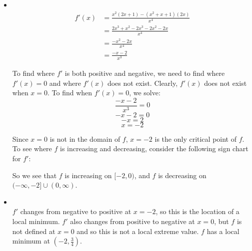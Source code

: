 \documentclass[handout,nooutcomes]{ximera}
\begin{document}
\begin{problem}
\begin{freeResponse}
\begin{itemize}
			
			
			\item  {}  \\
			
			\begin{align*}
			f'(x) &= \frac{x^2(2x+1) - (x^2+x+1)(2x)}{x^4} \\
			&= \frac{2x^3 + x^2 - 2x^3 - 2x^2 - 2x}{x^4} \\
			&= \frac{-x^2 - 2x}{x^4} \\
			&= \frac{-x-2}{x^3}
			\end{align*}
			
			To find where $f'$ is both positive and negative, we need to find where $f'(x) = 0$ and where $f'(x)$ does not exist.  Clearly, $f'(x)$ does not exist when $x=0$.  To find when $f'(x) = 0$, we solve:
			$$ \frac{-x-2}{x^3} = 0 $$
			$$ -x-2 = 0 $$
			$$ -x = 2 $$
			$$ x = -2 $$
			
			Since $x=0$ is not in the domain of $f$, $x=-2$ is the only critical point of $f$.  To see where $f$ is increasing and decreasing, consider the following sign chart for $f'$:
			
		
\begin{center}
\begin{image}
\end{image}
\end{center}


So we see that $f$ is increasing on $[-2,0)$, and $f$ is decreasing on $(-\infty, -2] \cup (0,\infty)$.

			
			
			
			\item  {}  \\
			$f'$ changes from negative to positive at $x=-2$, so this is the location of a local minimum.  $f'$ also changes from positive to negative at $x=0$, but $f$ is not defined at $x=0$ and so this is not a local extreme value. $f$ has a local minimum at $\left( -2,\frac{3}{4} \right)$.
			

\end{itemize}
\end{freeResponse}
\end{problem}
\end{document}
